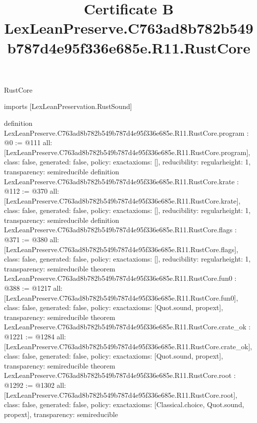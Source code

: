 \begin{lexlean}{RustCore}
\title{Certificate B LexLeanPreserve.C763ad8b782b549b787d4e95f336e685e.R11.RustCore}
\begin{coremodule}
imports [LexLeanPreservation.RustSound]

definition LexLeanPreserve.C763ad8b782b549b787d4e95f336e685e.R11.RustCore.program : @0 := @111 {
  all: [LexLeanPreserve.C763ad8b782b549b787d4e95f336e685e.R11.RustCore.program],
  class: false,
  generated: false,
  policy: exact{axioms: []},
  reducibility: regular{height: 1},
  transparency: semireducible
}
definition LexLeanPreserve.C763ad8b782b549b787d4e95f336e685e.R11.RustCore.krate : @112 := @370 {
  all: [LexLeanPreserve.C763ad8b782b549b787d4e95f336e685e.R11.RustCore.krate],
  class: false,
  generated: false,
  policy: exact{axioms: []},
  reducibility: regular{height: 1},
  transparency: semireducible
}
definition LexLeanPreserve.C763ad8b782b549b787d4e95f336e685e.R11.RustCore.flags : @371 := @380 {
  all: [LexLeanPreserve.C763ad8b782b549b787d4e95f336e685e.R11.RustCore.flags],
  class: false,
  generated: false,
  policy: exact{axioms: []},
  reducibility: regular{height: 1},
  transparency: semireducible
}
theorem LexLeanPreserve.C763ad8b782b549b787d4e95f336e685e.R11.RustCore.fun0 : @388 := @1217 {
  all: [LexLeanPreserve.C763ad8b782b549b787d4e95f336e685e.R11.RustCore.fun0],
  class: false,
  generated: false,
  policy: exact{axioms: [Quot.sound, propext]},
  transparency: semireducible
}
theorem LexLeanPreserve.C763ad8b782b549b787d4e95f336e685e.R11.RustCore.crate_ok : @1221 := @1284 {
  all: [LexLeanPreserve.C763ad8b782b549b787d4e95f336e685e.R11.RustCore.crate_ok],
  class: false,
  generated: false,
  policy: exact{axioms: [Quot.sound, propext]},
  transparency: semireducible
}
theorem LexLeanPreserve.C763ad8b782b549b787d4e95f336e685e.R11.RustCore.root : @1292 := @1302 {
  all: [LexLeanPreserve.C763ad8b782b549b787d4e95f336e685e.R11.RustCore.root],
  class: false,
  generated: false,
  policy: exact{axioms: [Classical.choice, Quot.sound, propext]},
  transparency: semireducible
}


\end{coremodule}
\end{lexlean}
